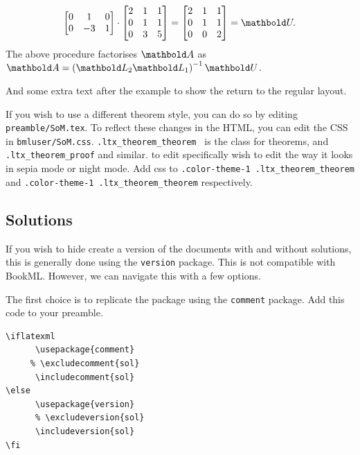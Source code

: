\begin{example}
\[\begin{bmatrix}
            0	&	1		&	0	\\
            0	&	-3	&	1	\\
        \end{bmatrix}
        \cdot
        \begin{bmatrix}
            2	&	1	&	1	\\
            0	&	1	&	1	\\
            0	&	3	&	5	\\
        \end{bmatrix}
        =
        \begin{bmatrix}
            2	&	1	&	1	\\
            0	&	1	&	1	\\
            0	&	0	&	2	\\
        \end{bmatrix}
        = \mat{U}.
    \]
    The above procedure factorises $\mat{A}$ as $\mat{A} = \left( \mat{L}_2\mat{L}_1 \right)^{-1}\mat{U}$.
\end{example}

And some extra text after the example to show the return to the regular layout.

If you wish to use a different theorem style, you can do so by editing \verb|preamble/SoM.tex|. To reflect these changes in the HTML, you can edit the CSS in \verb|bmluser/SoM.css|. \verb|.ltx_theorem_theorem | is the class for theorems, and \verb|.ltx_theorem_proof| and similar. to edit specifically wish to edit the way it looks in sepia mode or night mode. Add css to \verb|.color-theme-1 .ltx_theorem_theorem| and \verb|.color-theme-1 .ltx_theorem_theorem| respectively.

\subsection{Solutions}

If you wish to hide create a version of the documents with and without solutions, this is generally done using the \verb|version| package. This is not compatible with BookML. However, we can navigate this with a few options. 

The first choice is to replicate the package using the \verb|comment| package. Add this code to your preamble. 

\begin{lstlisting}
\iflatexml 
      \usepackage{comment} 
     % \excludecomment{sol} 
      \includecomment{sol} 
\else 
      \usepackage{version} 
      % \excludeversion{sol} 
      \includeversion{sol} 
\fi 
\end{lstlisting}

